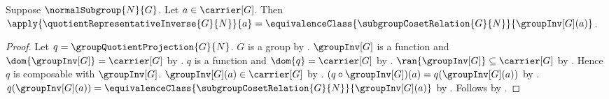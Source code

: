 \begin{proposition}\label{quotient_representative_inverse_apply}
    Suppose $\normalSubgroup{N}{G}$.
    Let $a\in\carrier[G]$.
    Then
        $\apply{\quotientRepresentativeInverse{G}{N}}{a}=
            \equivalenceClass
                {\subgroupCosetRelation{G}{N}}
                {\groupInv[G](a)}$.
\end{proposition}
\begin{proof}
    Let $q=\groupQuotientProjection{G}{N}$.
    $G$ is a group by .
    $\groupInv[G]$ is a function and
        $\dom{\groupInv[G]}=\carrier[G]$ by
        .
    $q$ is a function and $\dom{q}=\carrier[G]$ by
        .
    $\ran{\groupInv[G]}\subseteq\carrier[G]$ by
        .
    Hence $q$ is composable with $\groupInv[G]$.
    $\groupInv[G](a)\in\carrier[G]$ by .
    $(q\circ\groupInv[G])(a)=q(\groupInv[G](a))$ by
        .
    $q(\groupInv[G](a))=
        \equivalenceClass
            {\subgroupCosetRelation{G}{N}}
            {\groupInv[G](a)}$ by
        .
    Follows by .
\end{proof}

